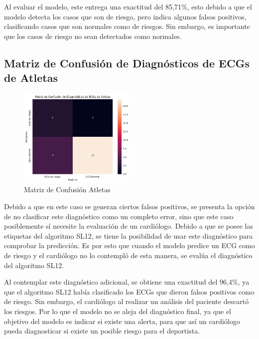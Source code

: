 \documentclass[conference]{IEEEtran}
\begin{document}
Al evaluar el modelo, este entrega una exactitud del 85,71\%, esto debido a que el modelo 
detecta los casos que son de riesgo, pero indica algunos falsos positivos, clasificando casos
 que son normales como de riesgos. Sin embargo, es importante que los casos de riesgo no sean 
 detectados como normales.

\subsection{Matriz de Confusión de Diagnósticos de ECGs de Atletas}
\begin{figure}[H]
    \includegraphics[width=0.5\textwidth]{./graficos/matrizConfusionAtletas.png}
    \caption{Matriz de Confusión Atletas}
\end{figure}

Debido a que en este caso se generan ciertos falsos positivos, se presenta la opción de no
 clasificar este diagnóstico como un completo error, sino que este caso posiblemente sí necesite
  la evaluación de un cardiólogo. Debido a que se posee las etiquetas del algoritmo SL12, 
  se tiene la posibilidad de usar este diagnóstico para comprobar la predicción. 
  Es por esto que cuando el modelo predice un ECG como de riesgo y el cardiólogo no lo 
  contempló de esta manera, se evalúa el diagnóstico del algoritmo SL12. 

Al contemplar este diagnóstico adicional, se obtiene una exactitud del 96,4\%, ya que el 
algoritmo SL12 había clasificado los ECGs que dieron falsos positivos como de riesgo. 
Sin embargo, el cardiólogo al realizar un análisis del paciente descartó los riesgos. 
Por lo que el modelo no se aleja del diagnóstico final, ya que el objetivo del modelo es 
indicar si existe una alerta, para que así un cardiólogo pueda diagnosticar si existe un 
posible riesgo para el deportista.
\end{document}
